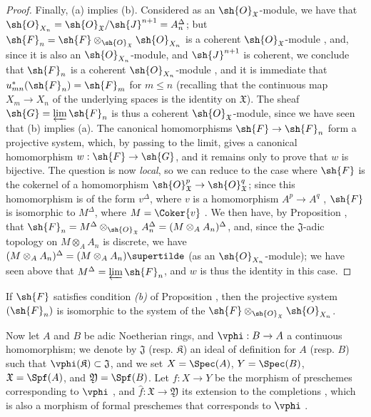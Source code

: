 \begin{proof}
Finally, (a) implies (b).
Considered as an $\sh{O}_\mathfrak{X}$-module, we have that $\sh{O}_{X_n}=\sh{O}_\mathfrak{X}/\sh{J}^{n+1}=A_n^\Delta$; but $\sh{F}_n=\sh{F}\otimes_{\sh{O}_\mathfrak{X}}\sh{O}_{X_n}$ is a coherent $\sh{O}_\mathfrak{X}$-module , and, since it is also an $\sh{O}_{X_n}$-module, and $\sh{J}^{n+1}$ is coherent, we conclude that $\sh{F}_n$ is a coherent $\sh{O}_{X_n}$-module , and it is immediate that $u_{mn}^*(\sh{F}_n)=\sh{F}_m$ for $m\leq n$ (recalling that the continuous map $X_m\to X_n$ of the underlying spaces is the identity on $\mathfrak{X}$).
The sheaf $\sh{G}=\varprojlim\sh{F}_n$ is thus a coherent $\sh{O}_\mathfrak{X}$-module, since we have seen that (b) implies (a). The canonical homomorphisms $\sh{F}\to\sh{F}_n$ form a projective system, which, by passing to the limit, gives a canonical homomorphism $w:\sh{F}\to\sh{G}$, and it remains only to prove that $w$ is bijective.
The question is now \emph{local}, so we can reduce to the case where $\sh{F}$ is the cokernel of a homomorphism $\sh{O}_\mathfrak{X}^p\to\sh{O}_\mathfrak{X}^q$; since this homomorphism is of the form $v^\Delta$, where $v$ is a homomorphism $A^p\to A^q$ , $\sh{F}$ is isomorphic to $M^\Delta$, where $M=\Coker{v}$ .
We then have, by Proposition , that $\sh{F}_n=M^\Delta\otimes_{\sh{O}_\mathfrak{X}}A_n^\Delta=(M\otimes_A A_n)^\Delta$, and, since the $\mathfrak{J}$-adic topology on $M\otimes_A A_n$ is discrete, we have $(M\otimes_A A_n)^\Delta=(M\otimes_A A_n)\supertilde$ (as an $\sh{O}_{X_n}$-module); we have seen above that $M^\Delta=\varprojlim\sh{F}_n$, and $w$ is thus the identity in this case.
\end{proof}

\begin{corollary}[10.10.6]
\label{I.10.10.6}
If $\sh{F}$ satisfies condition \emph{(b)} of Proposition , then the projective system $(\sh{F}_n)$ is isomorphic to the system of the $\sh{F}\otimes_{\sh{O}_\mathfrak{X}}\sh{O}_{X_n}$.
\end{corollary}

\begin{env}[10.10.7]
\label{I.10.10.7}
Now let $A$ and $B$ be adic Noetherian rings, and $\vphi:B\to A$ a continuous homomorphism; we denote by $\mathfrak{J}$ (resp. $\mathfrak{K}$) an ideal of definition for $A$ (resp. $B$) such that $\vphi(\mathfrak{K})\subset\mathfrak{J}$, and we set $X=\Spec(A)$, $Y=\Spec(B)$, $\mathfrak{X}=\Spf(A)$, and $\mathfrak{Y}=\Spf(B)$.
Let $f:X\to Y$ be the morphism of preschemes corresponding to $\vphi$ , and $\widehat{f}:\mathfrak{X}\to\mathfrak{Y}$ its extension to the completions , which is also a morphism of formal preschemes that corresponds to $\vphi$ .
\end{env}


